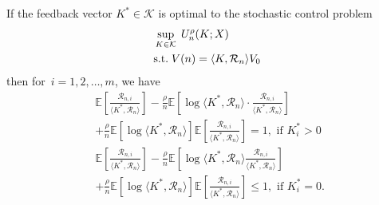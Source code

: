  
\begin{lemma} \label{Lemma: risk term}
    If the feedback vector $K^* \in \mathcal{K}$ is optimal to the stochastic control problem
\begin{align} 
    \begin{aligned} \label{problem: risk-sensitive problem}
        &\sup_{K \in \mathcal{K}}\; U_n^\rho (K; X)\\
        &{\rm s.t. } \; V(n) = \langle K, \mathcal{R}_n \rangle V_0 
    \end{aligned}
\end{align}
    then for~$i=1,2,\ldots,m$, we have
    \begin{align*}
        & \mathbb{E}\left[ \frac{ \mathcal{R}_{n,i} }{ \langle K^{*}, \mathcal{R}_n \rangle } \right] 
        - \frac{\rho}{n} \mathbb{E}\left[ \log \langle K^{*}, \mathcal{R}_n \rangle \cdot \frac{\mathcal{R}_{n,i}}{ \langle K^{*}, \mathcal{R}_n \rangle } \right] \\
        & +\frac{\rho}{n} \mathbb{E} \left[ \log \langle K^{*}, \mathcal{R}_n \rangle \right] \mathbb{E}\left[ \frac{\mathcal{R}_{n,i}}{\langle K^{*}, \mathcal{R}_n \rangle } \right] = 1, \text{ if $K_i^* > 0$ }
    \end{align*}
    \begin{align*}
         & \mathbb{E}\left[ \frac{\mathcal{R}_{n,i}}{\langle K^{*}, \mathcal{R}_n \rangle } \right] - \frac{\rho}{n}\mathbb{E}\left[ \log \langle K^{*}, \mathcal{R}_n \rangle \frac{\mathcal{R}_{n,i}}{\langle K^{*}, \mathcal{R}_n\rangle} \right] \\
        & +\frac{\rho}{n}\mathbb{E}\left[ \log \langle K^{*}, \mathcal{R}_n \rangle \right] \mathbb{E}\left[ \frac{\mathcal{R}_{n,i}}{ \langle K^{*}, \mathcal{R}_n \rangle } \right] \leq 1, \text{ if $K_i^* = 0$. }
    \end{align*}
\end{lemma}


